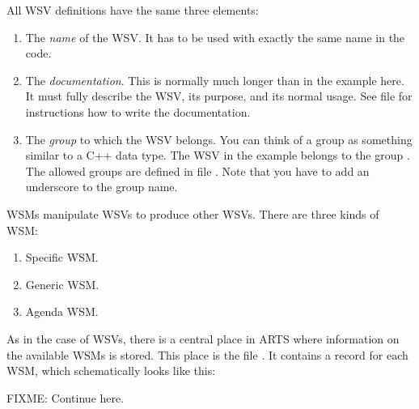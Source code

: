 All WSV definitions have the same three elements:
\begin{enumerate}
\item The \emph{name} of the WSV. It has to be used with exactly the
  same name in the code.
\item The \emph{documentation}. This is normally much longer than in
  the example here. It must fully describe the WSV, its purpose, and
  its normal usage. See file  for instructions
  how to write the documentation.
\item The \emph{group} to which the WSV belongs. You can think of a
  group as something similar to a C++ data type. The WSV in the
  example belongs to the group . The allowed groups
  are defined in file . Note that you have to add
  an underscore to the group name.
\end{enumerate}

\label{sec:agendas:wsms}

WSMs manipulate WSVs to produce other WSVs. There are three kinds of
WSM:
\begin{enumerate}
\item Specific WSM.
\item Generic WSM.
\item Agenda WSM.
\end{enumerate}
As in the case of WSVs, there is a central place in ARTS where
information on the available WSMs is stored. This place is the file
. It contains a record for each WSM, which
schematically looks like this: 

FIXME: Continue here.

\begin{verbatim}

\end{verbatim}

\label{sec:agendas:agendas}




